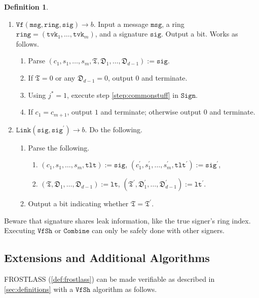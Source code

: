 \documentclass[11pt]{article}
\theoremstyle{definition}
\newtheorem{definition}[definition]{Definition}
\newcommand{\lt}{\texttt{lt}}
\newcommand{\tlt}{\texttt{tlt}}
\newcommand{\tvk}{\texttt{tvk}}
\newcommand{\ring}{\texttt{ring}}
\newcommand{\sig}{\texttt{sig}}
\newcommand{\msg}{\texttt{msg}}
\newcommand{\sign}{\texttt{Sign}}
\newcommand{\combine}{\texttt{Combine}}
\newcommand{\verify}{\texttt{Vf}}
\newcommand{\link}{\texttt{Link}}
\newcommand{\verifyshare}{\texttt{VfSh}}
\begin{document}
\begin{definition}
\begin{enumerate}
\item $\verify(\msg, \ring, \sig) \to b$. Input a message $\msg$, a ring $\ring = (\tvk_1, \ldots, \tvk_m)$, and a signature $\sig$. Output a bit. Works as follows.
\begin{enumerate}
\item Parse $(c_1, s_1, \ldots, s_m, \mathfrak{T}, \mathfrak{D}_1, \ldots, \mathfrak{D}_{d-1}) := \sig$. 
\item If $\mathfrak{T} = 0$ or any $\mathfrak{D}_{d-1} = 0$, output $0$ and terminate.
\item Using $j^* = 1$, execute step \cref{step:commonstuff} in $\sign$.
\item If $c_1 = c_{m+1}$, output $1$ and terminate; otherwise output $0$ and terminate.
\end{enumerate}


\item $\link(\sig, \sig^\prime) \to b$. Do the following.
\begin{enumerate}
\item Parse the following.
\begin{enumerate}
\item $(c_1, s_1, \ldots, s_m, \tlt) := \sig$, $(c_1^\prime, s_1^\prime, \ldots, s_m^\prime, \tlt^\prime) := \sig^\prime$,
\item $(\mathfrak{T}, \mathfrak{D}_1, \ldots, \mathfrak{D}_{d-1}) := \lt$,  $(\mathfrak{T}^\prime, \mathfrak{D}_1^\prime, \ldots, \mathfrak{D}_{d-1}^\prime) := \lt^\prime$. 
\end{enumerate}
\item Output a bit indicating whether $\mathfrak{T} = \mathfrak{T}^\prime$.
\end{enumerate} 


\end{enumerate}
\end{definition}

Beware that signature shares leak information, like the true signer's ring index. Executing $\verifyshare$ or $\combine$ can only be safely done with other signers.


\subsection{Extensions and Additional Algorithms}\label{sec:extensions}



FROSTLASS (\cref{def:frostlass}) can be made verifiable as described in \cref{sec:definitions} with a $\verifyshare$ algorithm as follows.
\end{document}
